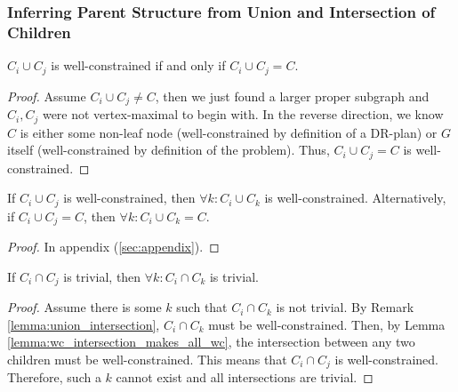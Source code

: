





\subsubsection{Inferring Parent Structure from Union and Intersection of Children}
\label{sec:infer_parent}


\begin{lemma}\label{lemma:wc_intersection_is_C}
$C_i\cup C_j$ is well-constrained if and only if $C_i\cup C_j = C$.
\end{lemma}

\begin{proof}
Assume $C_i\cup C_j \neq C$, then we just found a larger proper subgraph and $C_i,C_j$ were not vertex-maximal to begin with.
%
In the reverse direction, we know $C$ is either some non-leaf node (well-constrained by definition of a DR-plan) or $G$ itself (well-constrained by definition of the problem). Thus, $C_i\cup C_j=C$ is well-constrained.
\end{proof}



\begin{lemma}\label{lemma:wc_intersection_makes_all_wc}
If $C_i\cup C_j$ is well-constrained, then $\forall k: C_i\cup C_k$ is well-constrained.
Alternatively, if $C_i\cup C_j=C$, then $\forall k: C_i\cup C_k=C$.
\end{lemma}

\begin{proof}
In appendix (\ref{sec:appendix}).
\end{proof}



\begin{lemma}\label{lemma:uc_intersection_makes_all_uc}
If $C_i\cap C_j$ is trivial, then $\forall k: C_i\cap C_k$ is trivial.
\end{lemma}

\begin{proof}
Assume there is some $k$ such that $C_i\cap C_k$ is not trivial. By Remark \ref{lemma:union_intersection}, $C_i\cap C_k$ must be well-constrained. Then, by Lemma \ref{lemma:wc_intersection_makes_all_wc}, the intersection between any two children must be well-constrained. This means that $C_i\cap C_j$ is well-constrained. Therefore, such a $k$ cannot exist and all intersections are trivial.
\end{proof}


